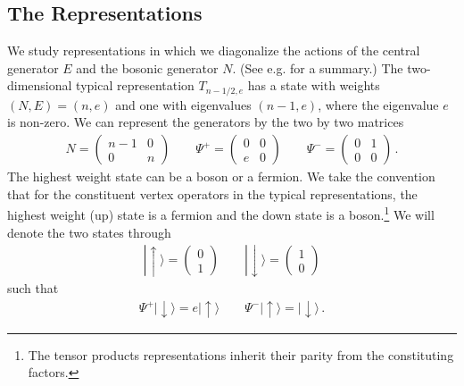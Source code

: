 \documentclass[12pt]{article}
\numberwithin{equation}{section}
\numberwithin{equation}{section}
\numberwithin{table}{section}\setlength{\multlinegap}{25pt}
\begin{document}
\subsection{The  Representations}
 We study representations in which
we diagonalize the actions of the central generator $E$ and the bosonic generator
$N$. (See e.g. \cite{Creutzig:2011np} for a summary.)  The
two-dimensional typical representation 
$T_{n-1/2,e}$ has a state with weights $(N,E)=(n,e)$ and one with eigenvalues $(n-1,e)$, where the eigenvalue $e$ is non-zero. We can represent the 
generators by the two by two matrices
\begin{eqnarray}
N = \left( \begin{array}{cc}
        n-1 & 0 \\
         0  & n 
       \end{array}  \right) \qquad
\Psi^+ = \left( \begin{array}{cc}
        0 & 0 \\
         e  & 0 
       \end{array}  \right)
\qquad
\Psi^- = \left( \begin{array}{cc}
        0 & 1 \\
         0  & 0 
       \end{array}  \right) \, .
\end{eqnarray}
The highest weight state can be a  boson or a fermion. We take the convention that for the constituent vertex operators in the typical
representations, the highest weight (up) state is a fermion
and the down state is a boson.\footnote{The tensor products representations inherit their parity from the constituting factors.}
We will  denote the two states through
\begin{eqnarray}
| \! \uparrow \rangle = \left( \begin{array}{c}
         0 \\
         1  
       \end{array}  \right)
\qquad
| \! \downarrow \rangle = \left( \begin{array}{c}
         1 \\
         0  
       \end{array}  \right)
\end{eqnarray}
such that
\begin{eqnarray}
\Psi^+ | \! \downarrow \rangle = e | \! \uparrow \rangle \qquad
\Psi^- | \! \uparrow \rangle = | \! \downarrow \rangle \, .
\end{eqnarray}
\end{document}
